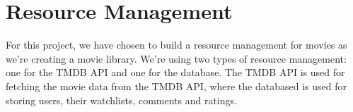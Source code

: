 \section{Resource Management}

For this project, we have chosen to build a resource management for movies as we're creating a movie library.
We're using two types of resource management: one for the TMDB API and one for the database.
The TMDB API is used for fetching the movie data from the TMDB API, where the databased is used for storing users, their watchlists, comments and ratings.

